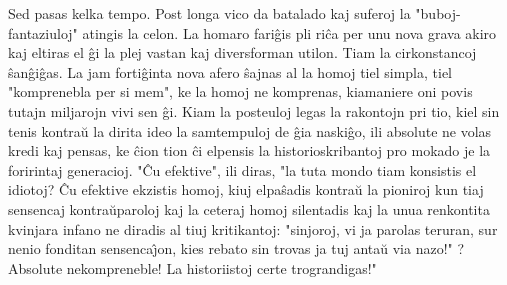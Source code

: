    Sed pasas kelka tempo. Post longa vico da batalado kaj suferoj la
"buboj-fantaziuloj" atingis la celon. La homaro fari\^gis pli
ri\^ca per unu nova grava akiro kaj eltiras el \^gi la plej vastan
kaj diversforman utilon. Tiam la cirkonstancoj \^san\^gi\^gas. La
jam forti\^ginta nova afero \^sajnas al la homoj tiel simpla, tiel
"komprenebla per si mem", ke la homoj ne komprenas, kiamaniere oni
povis tutajn miljarojn vivi sen \^gi. Kiam la posteuloj legas la
rakontojn pri tio, kiel sin tenis kontra\u u la dirita ideo la
samtempuloj de \^gia naski\^go, ili absolute ne volas kredi kaj
pensas, ke \^cion tion \^ci elpensis la historioskribantoj pro
mokado je la foririntaj generacioj. "\^Cu efektive", ili diras,
"la tuta mondo tiam konsistis el idiotoj? \^Cu efektive ekzistis
homoj, kiuj elpa\^sadis kontra\u u la pioniroj kun tiaj sensencaj
kontra\u uparoloj kaj la ceteraj homoj silentadis kaj la unua
renkontita kvinjara infano ne diradis al tiuj kritikantoj:
"sinjoroj, vi ja parolas teruran, sur nenio fonditan
sensenca\^{\j}on, kies rebato sin trovas ja tuj anta\u u via nazo!"
? Absolute nekompreneble! La historiistoj certe trograndigas!"

